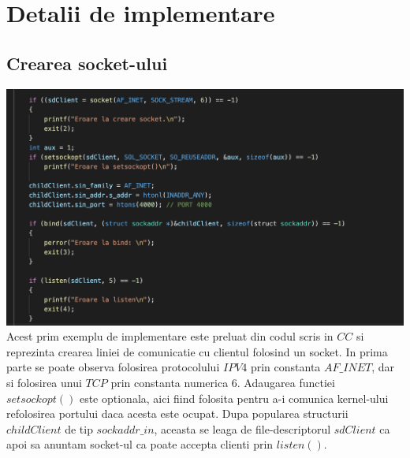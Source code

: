 \documentclass{llncs}
\begin{document}
\section{Detalii de implementare}
\subsection{Crearea socket-ului}
\includegraphics[scale=0.55]{socket}
\hspace*{4mm} Acest prim exemplu de implementare este preluat din codul scris in $CC$ si reprezinta crearea liniei de comunicatie cu clientul folosind un socket. In prima parte se poate observa folosirea protocolului $IPV4$ prin constanta $AF\_INET$, dar si folosirea unui $TCP$ prin constanta numerica $6.$ Adaugarea functiei $setsockopt()$ este optionala, aici fiind folosita pentru a-i comunica kernel-ului refolosirea portului daca acesta este ocupat. Dupa popularea structurii $childClient$ de tip $sockaddr\_in$, aceasta se leaga de file-descriptorul $sdClient$ ca apoi sa anuntam socket-ul ca poate accepta clienti prin $listen()$. \\
\vspace{10mm}
\end{document}
